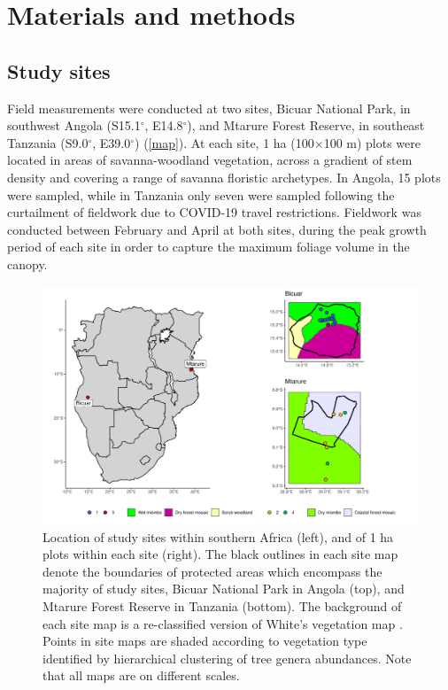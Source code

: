 \documentclass[11pt,a4paper]{article}
\begin{document}
\section{Materials and methods}

\subsection{Study sites}

Field measurements were conducted at two sites, Bicuar National Park, in southwest Angola (S15.1$^\circ$, E14.8$^\circ$), and Mtarure Forest Reserve, in southeast Tanzania (S9.0$^\circ$, E39.0$^\circ$) (\autoref{map}). At each site, 1 ha (100$\times$100 m) plots were located in areas of savanna-woodland vegetation, across a gradient of stem density and covering a range of savanna floristic archetypes. In Angola, 15 plots were sampled, while in Tanzania only seven were sampled following the curtailment of fieldwork due to COVID-19 travel restrictions. Fieldwork was conducted between February and April at both sites, during the peak growth period of each site in order to capture the maximum foliage volume in the canopy.

\begin{figure}
	\includegraphics[width=\linewidth]{map}
	\caption{Location of study sites within southern Africa (left), and of 1 ha plots within each site (right). The black outlines in each site map denote the boundaries of protected areas which encompass the majority of study sites, Bicuar National Park in Angola (top), and Mtarure Forest Reserve in Tanzania (bottom). The background of each site map is a re-classified version of White's vegetation map \citep{White1983}. Points in site maps are shaded according to vegetation type identified by hierarchical clustering of tree genera abundances. Note that all maps are on different scales.}
	\label{map}
\end{figure}
\end{document}
